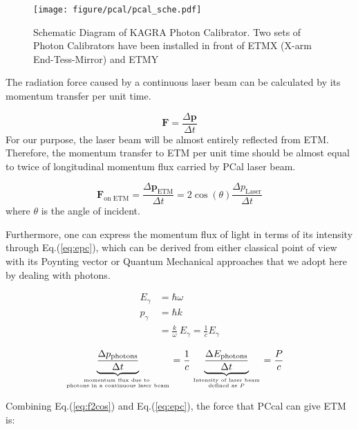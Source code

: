 \begin{figure}[bt]
\centering
\texttt{[image: figure/pcal/pcal\_sche.pdf]}
\caption[Schematic Diagram of KAGRA Photon Calibrator]{Schematic Diagram of KAGRA Photon Calibrator. Two sets of Photon Calibrators have been installed in front of ETMX (X-arm End-Tess-Mirror) and ETMY  }
\label{fig:pcal_sche}
\end{figure}

The radiation force caused by a continuous laser beam can be calculated by its momentum transfer per unit time.

\begin{equation}
    \mathbf{F} = \frac{\Delta \mathbf{p}}{\Delta t}
\end{equation}
For our purpose, the laser beam will be almost entirely reflected from ETM. Therefore, the momentum transfer to ETM per unit time should be almost equal to twice of longitudinal momentum flux carried by PCal laser beam.

\begin{equation}
\label{eq:f2cos}
    \mathbf{F}_\text{on ETM} = \frac{\Delta \mathbf{p}_\text{ETM}}{\Delta t}
    = 2 \cos(\theta) \frac{\Delta p_\text{Laser} }{\Delta t}
\end{equation}
where $\theta$ is the angle of incident.

Furthermore, one can express the momentum flux of light in terms of its intensity through Eq.(\ref{eq:epc}), which can be derived from either classical point of view with its Poynting vector or Quantum Mechanical approaches that we adopt here by dealing with photons. 

\begin{align}
   E_{\gamma} &= \hbar \omega \\
   p_{\gamma} &= \hbar k \\
              &= \frac{k}{\omega} ~ E_{\gamma} = \frac{1}{c}E_{\gamma}
\end{align}

\begin{align}
\label{eq:epc}
   \underbrace{\frac{\Delta p_{\text{photons}}}{\Delta t}}_{\text{momentum flux due to }\atop \text{photons in a continuous laser beam}}
   &= \frac{1}{c}
   \underbrace{ \frac{\Delta E_{\text{photons}}}{\Delta t} }_{\text{Intensity of laser beam}\atop \text{defined as } P}
   = \frac{P}{c} 
\end{align}

Combining Eq.(\ref{eq:f2cos}) and Eq.(\ref{eq:epc}), the force that PCcal can give ETM is:

